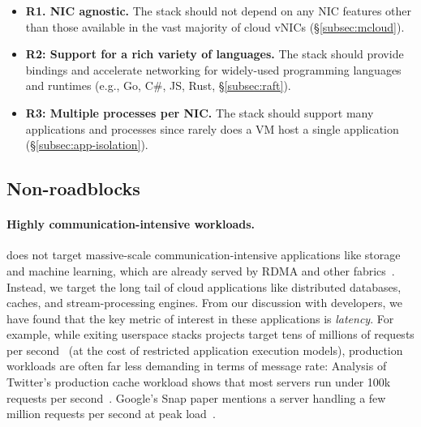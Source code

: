 \begin{itemize}
    \item \textbf{R1. NIC agnostic.} The stack should not depend on any NIC features other than those available in the vast majority of cloud vNICs (\S\ref{subsec:mcloud}).
    \item \textbf{R2: Support for a rich variety of languages.} The stack should provide bindings and accelerate networking for widely-used programming languages and runtimes (e.g., Go, C\#, JS, Rust, \S\ref{subsec:raft}).
    \item \textbf{R3: Multiple processes per NIC.} The stack should support many applications and processes since rarely does a VM host a single application (\S\ref{subsec:app-isolation}).
\end{itemize}

\subsection{Non-roadblocks}
\label{sec:non_roadblocks}

\paragraph{Highly communication-intensive workloads.}
\mt{} does not target massive-scale communication-intensive applications like storage and machine learning, which are already served by RDMA and other fabrics~\cite{Bai:nsdi23, azurehpc, efa}.
Instead, we target the long tail of cloud applications like distributed databases, caches, and stream-processing engines.
From our discussion with developers, we have found that the key metric of interest in these applications is \emph{latency}.
For example, while exiting userspace stacks projects target tens of millions of requests per second~\cite{erpc,demi-kernel,farm,kv-driect} (at the cost of restricted application execution models), production workloads are often far less demanding in terms of message rate:
Analysis of Twitter's production cache workload shows that most servers run under 100k requests per second~\cite{twitter-trace}.
Google's Snap paper mentions a server handling a few million requests per second at peak load~\cite{snap}.

